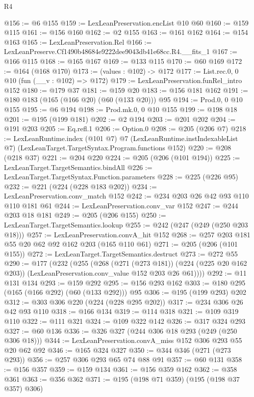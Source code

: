 \begin{lexlean}{R4}
\begin{coremodule}
@156 := @6 @155
@159 := LexLeanPreservation.encList @10 @60
@160 := @159 @115
@161 := @156 @160
@162 := @2 @155
@163 := @161 @162
@164 := @154 @163
@165 := LexLeanPreservation.Rel
@166 := LexLeanPreserve.Cf1490b48684e9222dee9043db41e68cc.R4.__fits_1
@167 := @166 @115
@168 := @165 @167
@169 := @133 @115
@170 := @60 @169
@172 := @164 (@168 @170)
@173 := (values : @102) -> @172
@177 := List.rec.{0, 0} @10 (fun (__v : @102) => @172)
@179 := LexLeanPreservation.funRel_intro @152
@180 := @179 @37
@181 := @159 @20
@183 := @156 @181 @162
@191 := @180 @183 (@165 (@166 @20) (@60 (@133 @20))) @95
@194 := Prod.{0, 0} @10 @155
@195 := @6 @194
@198 := Prod.mk.{0, 0} @10 @155
@199 := @198 @18
@201 := @195 (@199 @181)
@202 := @2 @194
@203 := @201 @202
@204 := @191 @203
@205 := Eq.refl.{1}
@206 := Option.{0}
@208 := @205 (@206 @7)
@218 := LexLeanRuntime.index
    (@101 @7)
    @7
    (LexLeanRuntime.instIndexableList @7)
    (LexLeanTarget.TargetSyntax.Program.functions @152)
@220 := @208 (@218 @37)
@221 := @204 @220
@224 := @205 (@206 (@101 @194))
@225 := LexLeanTarget.TargetSemantics.bindAll
@226 := LexLeanTarget.TargetSyntax.Function.parameters
@228 := @225 (@226 @95)
@232 := @221 (@224 (@228 @183 @202))
@234 := LexLeanPreservation.conv_match @152
@242 := @234 @203 @26 @42 @93 @110 @110 @181 @61
@244 := LexLeanPreservation.conv_var @152
@247 := @244 @203 @18 @181
@249 := @205 (@206 @155)
@250 := LexLeanTarget.TargetSemantics.lookup
@255 := @242 (@247 (@249 (@250 @203 @18)))
@257 := LexLeanPreservation.convA_hit @152
@268 := @257 @203 @181 @55 @20 @62 @92 @162 @203 (@165 @110 @61)
@271 := @205 (@206 (@101 @155))
@272 := LexLeanTarget.TargetSemantics.destruct
@273 := @272 @55
@290 := @177
    (@232
      (@255
        (@268
          (@271 (@273 @181))
          (@224 (@225 @20 @162 @203))
          (LexLeanPreservation.conv_value @152 @203 @26 @61))))
@292 := @11 @131 @134
@293 := @159 @292
@295 := @156 @293 @162
@303 := @180 @295 (@165 (@166 @292) (@60 (@133 @292))) @95
@306 := @195 (@199 @293) @202
@312 := @303 @306 @220 (@224 (@228 @295 @202))
@317 := @234 @306 @26 @42 @93 @110
@318 := @166 @134
@319 := @114 @318
@321 := @109 @319 @110
@322 := @111 @321
@324 := @109 @322 @142
@326 := @317 @324 @293
@327 := @60 @136
@336 := @326 @327 (@244 @306 @18 @293 (@249 (@250 @306 @18)))
@344 := LexLeanPreservation.convA_miss @152 @306 @293 @55 @20 @62 @92
@346 := @165 @324 @327
@350 := @344 @346 (@271 (@273 @293))
@356 := @257 @306 @293 @65 @74 @88 @91
@357 := @60 @131
@358 := @156 @357
@359 := @159 @134
@361 := @156 @359 @162
@362 := @358 @361
@363 := @356 @362
@371 := @195 (@198 @71 @359) (@195 (@198 @37 @357) @306)

\end{coremodule}
\end{lexlean}
